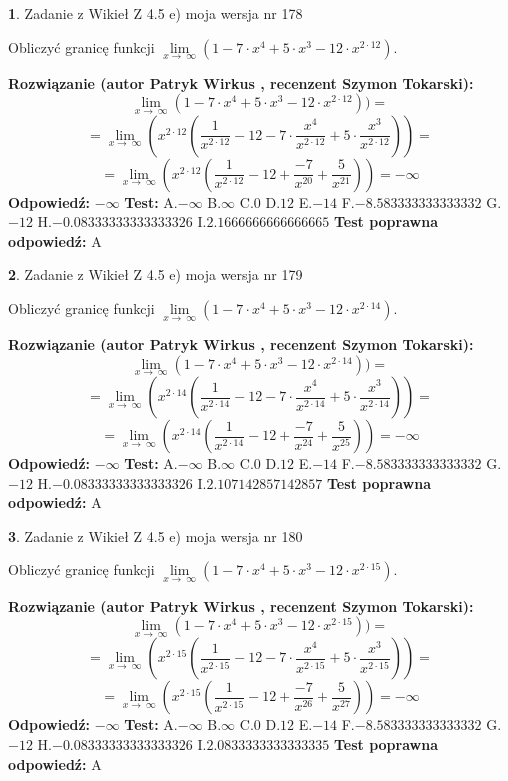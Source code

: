 \documentclass[12pt, a4paper]{article}
\theoremstyle{definition} %
\newtheorem{zad}{}
\newcommand{\zadStart}[1]{\begin{zad}#1\newline}
\newcommand{\zadStop}{\end{zad}}
\newcommand{\rozwStart}[2]{\noindent \textbf{Rozwiązanie (autor #1 , recenzent #2): }\newline}
\newcommand{\rozwStop}{\newline}
\newcommand{\odpStart}{\noindent \textbf{Odpowiedź:}\newline}
\newcommand{\odpStop}{\newline}
\newcommand{\testStart}{\noindent \textbf{Test:}\newline}
\newcommand{\testStop}{\newline}
\newcommand{\kluczStart}{\noindent \textbf{Test poprawna odpowiedź:}\newline}
\newcommand{\kluczStop}{\newline}
\begin{document}
\zadStart{Zadanie z Wikieł Z 4.5 e) moja wersja nr 178}


Obliczyć granicę funkcji  $\lim\limits_{x\to\ \infty}(1 - 7 \cdot x^{4}+5 \cdot x^{3}- 12 \cdot x^{2\cdot12})$.
\zadStop
\rozwStart{Patryk Wirkus}{Szymon Tokarski}
$$\lim\limits_{x\to\ \infty}(1 - 7 \cdot x^{4}+5 \cdot x^{3}- 12 \cdot x^{2\cdot12}))=$$
$$=\lim\limits_{x\to\ \infty}(x^{2\cdot12}(\frac{1}{x^{2\cdot12}}-12 -7 \cdot \frac{x^{4}}{x^{2\cdot12}}+5 \cdot \frac{x^{3}}{x^{2\cdot12}}))=$$
$$=\lim\limits_{x\to\ \infty}(x^{2\cdot12}(\frac{1}{x^{2\cdot12}}-12 + \frac{-7}{x^{20}}+ \frac{5}{x^{21}}))=-\infty$$
\rozwStop
\odpStart
$-\infty$
\odpStop
\testStart
A.$-\infty$ B.$\infty$ C.$0$ D.$12$ E.$-14$
F.$-8.583333333333332$ G.$-12$
H.$-0.08333333333333326$
I.$2.1666666666666665$
\testStop
\kluczStart
A
\kluczStop



\zadStart{Zadanie z Wikieł Z 4.5 e) moja wersja nr 179}


Obliczyć granicę funkcji  $\lim\limits_{x\to\ \infty}(1 - 7 \cdot x^{4}+5 \cdot x^{3}- 12 \cdot x^{2\cdot14})$.
\zadStop
\rozwStart{Patryk Wirkus}{Szymon Tokarski}
$$\lim\limits_{x\to\ \infty}(1 - 7 \cdot x^{4}+5 \cdot x^{3}- 12 \cdot x^{2\cdot14}))=$$
$$=\lim\limits_{x\to\ \infty}(x^{2\cdot14}(\frac{1}{x^{2\cdot14}}-12 -7 \cdot \frac{x^{4}}{x^{2\cdot14}}+5 \cdot \frac{x^{3}}{x^{2\cdot14}}))=$$
$$=\lim\limits_{x\to\ \infty}(x^{2\cdot14}(\frac{1}{x^{2\cdot14}}-12 + \frac{-7}{x^{24}}+ \frac{5}{x^{25}}))=-\infty$$
\rozwStop
\odpStart
$-\infty$
\odpStop
\testStart
A.$-\infty$ B.$\infty$ C.$0$ D.$12$ E.$-14$
F.$-8.583333333333332$ G.$-12$
H.$-0.08333333333333326$
I.$2.107142857142857$
\testStop
\kluczStart
A
\kluczStop



\zadStart{Zadanie z Wikieł Z 4.5 e) moja wersja nr 180}


Obliczyć granicę funkcji  $\lim\limits_{x\to\ \infty}(1 - 7 \cdot x^{4}+5 \cdot x^{3}- 12 \cdot x^{2\cdot15})$.
\zadStop
\rozwStart{Patryk Wirkus}{Szymon Tokarski}
$$\lim\limits_{x\to\ \infty}(1 - 7 \cdot x^{4}+5 \cdot x^{3}- 12 \cdot x^{2\cdot15}))=$$
$$=\lim\limits_{x\to\ \infty}(x^{2\cdot15}(\frac{1}{x^{2\cdot15}}-12 -7 \cdot \frac{x^{4}}{x^{2\cdot15}}+5 \cdot \frac{x^{3}}{x^{2\cdot15}}))=$$
$$=\lim\limits_{x\to\ \infty}(x^{2\cdot15}(\frac{1}{x^{2\cdot15}}-12 + \frac{-7}{x^{26}}+ \frac{5}{x^{27}}))=-\infty$$
\rozwStop
\odpStart
$-\infty$
\odpStop
\testStart
A.$-\infty$ B.$\infty$ C.$0$ D.$12$ E.$-14$
F.$-8.583333333333332$ G.$-12$
H.$-0.08333333333333326$
I.$2.0833333333333335$
\testStop
\kluczStart
A
\kluczStop
\end{document}
